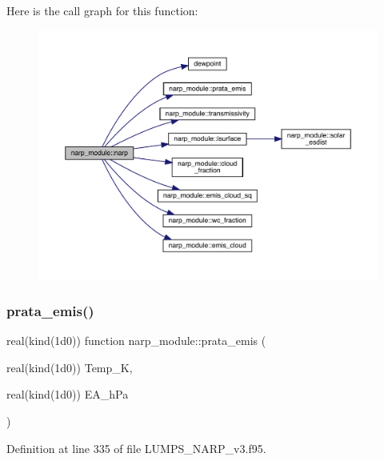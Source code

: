 Here is the call graph for this function\+:\nopagebreak
\begin{figure}[H]
\begin{center}
\leavevmode
\includegraphics[width=350pt]{namespacenarp__module_ac480c3115a6413b9e79770f601e68895_cgraph}
\end{center}
\end{figure}
\mbox{\label{namespacenarp__module_acfe7f0cf64c053bc528f54bde3ce8194}} 
\subsubsection{\texorpdfstring{prata\+\_\+emis()}{prata\_emis()}}
{\footnotesize\ttfamily real(kind(1d0)) function narp\+\_\+module\+::prata\+\_\+emis (\begin{DoxyParamCaption}\item[{real(kind(1d0))}]{Temp\+\_\+K,  }\item[{real(kind(1d0))}]{E\+A\+\_\+h\+Pa }\end{DoxyParamCaption})}



Definition at line 335 of file L\+U\+M\+P\+S\+\_\+\+N\+A\+R\+P\+\_\+v3.\+f95.

\mbox{\label{namespacenarp__module_a2855b93202c40f690a05a6febcdc8067}} 
